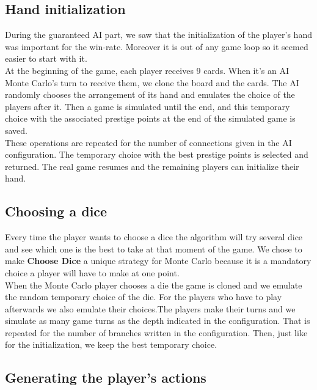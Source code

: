         \subsection{Hand initialization}
        
        During the guaranteed AI part, we saw that the initialization of the player's hand was important for the win-rate. Moreover it is out of any game loop so it seemed easier to start with it.\\
        At the beginning of the game, each player receives 9 cards. When it's an AI Monte Carlo's turn to receive them, we clone the board and the cards. The AI randomly chooses the arrangement of its hand and emulates the choice of the players after it. Then a game is simulated until the end, and this temporary choice with the associated prestige points at the end of the simulated game is saved.\\
        These operations are repeated for the number of connections given in the AI configuration.
        The temporary choice with the best prestige points is selected and returned.
        The real game resumes and the remaining players can initialize their hand.
        
        \subsection{Choosing a dice}
        
        Every time the player wants to choose a dice the algorithm will try several dice and see which one is the best to take at that moment of the game. We chose to make \textbf{Choose Dice} a unique strategy for Monte Carlo because it is a mandatory choice a player will have to make at one point.\\
        When the Monte Carlo player chooses a die the game is cloned and we emulate the random temporary choice of the die. For the players who have to play afterwards we also emulate their choices.The players make their turns and we simulate as many game turns as the depth indicated in the configuration. That is repeated for the number of branches written in the configuration. Then, just like for the initialization, we keep the best temporary choice.
        
        \subsection{Generating the player's actions}
        
